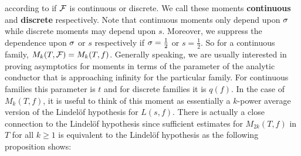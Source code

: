   according to if $\mathcal{F}$ is continuous or discrete. We call these moments \textbf{continuous} and \textbf{discrete} respectively. Note that continuous moments only depend upon $\sigma$ while discrete moments may depend upon $s$. Moreover, we suppress the dependence upon $\sigma$ or $s$ respectively if $\sigma = \frac{1}{2}$ or $s = \frac{1}{2}$. So for a continuous family, $M_{k}(T,\mathcal{F}) = M_{k}(T,f)$. Generally speaking, we are usually interested in proving asymptotics for moments in terms of the parameter of the analytic conductor that is approaching infinity for the particular family. For continuous families this parameter is $t$ and for discrete families it is $q(f)$. In the case of $M_{k}(T,f)$, it is useful to think of this moment as essentially a $k$-power average version of the Lindel\"of hypothesis for $L(s,f)$. There is actually a close connection to the Lindel\"of hypothesis since sufficient estimates for $M_{2k}(T,f)$ in $T$ for all $k \ge 1$ is equivalent to the Lindel\"of hypothesis as the following proposition shows:


